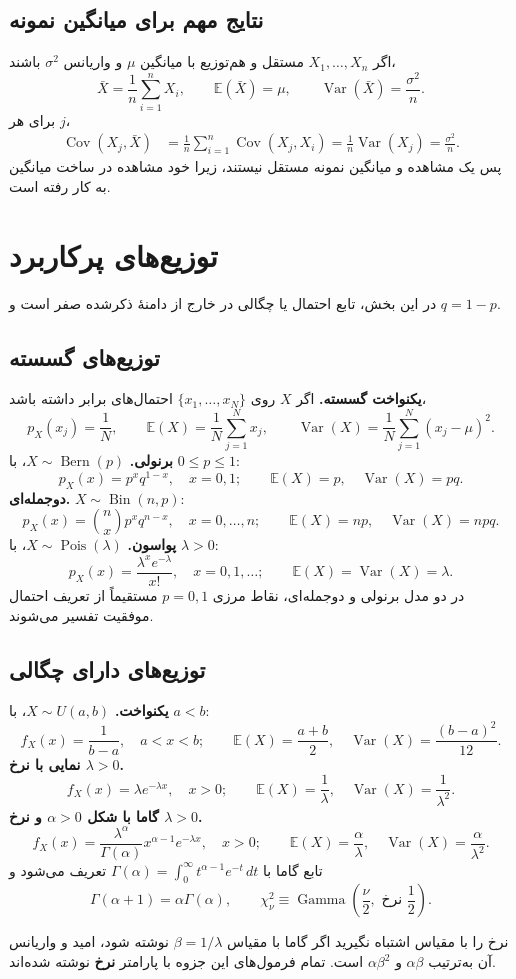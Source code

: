 \documentclass[12pt,a4paper,oneside]{report}
\newcounter{ex}[chapter]
\newcommand{\E}{\mathbb E}
\newcommand{\Var}{\operatorname{Var}}
\newcommand{\Cov}{\operatorname{Cov}}
\begin{document}
\subsection{نتایج مهم برای میانگین نمونه}
اگر $X_1,\ldots,X_n$ مستقل و هم‌توزیع با میانگین $\mu$ و واریانس $\sigma^2$ باشند،
\[
\bar X=\frac1n\sum_{i=1}^nX_i,\qquad
\E(\bar X)=\mu,\qquad \Var(\bar X)=\frac{\sigma^2}{n}.
\]
برای هر $j$،
\begin{align*}
\Cov(X_j,\bar X)
&=\frac1n\sum_{i=1}^n\Cov(X_j,X_i)
=\frac1n\Var(X_j)=\frac{\sigma^2}{n}.
\end{align*}
پس یک مشاهده و میانگین نمونه مستقل نیستند، زیرا خود مشاهده در ساخت میانگین به کار رفته است.
\section{توزیع‌های پرکاربرد}
در این بخش، تابع احتمال یا چگالی در خارج از دامنهٔ ذکرشده صفر است و $q=1-p$.
\subsection{توزیع‌های گسسته}
\textbf{یکنواخت گسسته.} اگر $X$ روی $\{x_1,\ldots,x_N\}$ احتمال‌های برابر داشته باشد،
\[
p_X(x_j)=\frac1N,\qquad
\E(X)=\frac1N\sum_{j=1}^N x_j,\qquad
\Var(X)=\frac1N\sum_{j=1}^N(x_j-\mu)^2.
\]
\textbf{برنولی.} $X\sim\operatorname{Bern}(p)$، با $0\le p\le1$:
\[
p_X(x)=p^xq^{1-x},\quad x=0,1;\qquad
\E(X)=p,\quad\Var(X)=pq.
\]
\textbf{دوجمله‌ای.} $X\sim\operatorname{Bin}(n,p)$:
\[
p_X(x)=\binom nx p^xq^{n-x},\quad x=0,\ldots,n;\qquad
\E(X)=np,\quad\Var(X)=npq.
\]
\textbf{پواسون.} $X\sim\operatorname{Pois}(\lambda)$، با $\lambda>0$:
\[
p_X(x)=\frac{\lambda^x e^{-\lambda}}{x!},\quad x=0,1,\ldots;
\qquad\E(X)=\Var(X)=\lambda.
\]
در دو مدل برنولی و دوجمله‌ای، نقاط مرزی $p=0,1$ مستقیماً از تعریف احتمال موفقیت تفسیر می‌شوند.
\subsection{توزیع‌های دارای چگالی}
\textbf{یکنواخت.} $X\sim U(a,b)$، با $a<b$:
\[
f_X(x)=\frac1{b-a},\quad a<x<b;\qquad
\E(X)=\frac{a+b}{2},\quad\Var(X)=\frac{(b-a)^2}{12}.
\]
\textbf{نمایی با نرخ $\lambda>0$.}
\[
f_X(x)=\lambda e^{-\lambda x},\quad x>0;\qquad
\E(X)=\frac1\lambda,\quad\Var(X)=\frac1{\lambda^2}.
\]
\textbf{گاما با شکل $\alpha>0$ و نرخ $\lambda>0$.}
\[
f_X(x)=\frac{\lambda^\alpha}{\Gamma(\alpha)}x^{\alpha-1}e^{-\lambda x},\quad x>0;
\qquad\E(X)=\frac\alpha\lambda,\quad\Var(X)=\frac\alpha{\lambda^2}.
\]
تابع گاما با $\Gamma(\alpha)=\int_0^\infty t^{\alpha-1}e^{-t}\,dt$ تعریف می‌شود و
\[
\Gamma(\alpha+1)=\alpha\Gamma(\alpha),\qquad
\chi^2_\nu\equiv\operatorname{Gamma}\left(\frac\nu2,\text{ نرخ }\frac12\right).
\]
\begin{important}{نرخ را با مقیاس اشتباه نگیرید}
اگر گاما با مقیاس $\beta=1/\lambda$ نوشته شود، امید و واریانس آن به‌ترتیب $\alpha\beta$ و $\alpha\beta^2$ است. تمام فرمول‌های این جزوه با پارامتر \textbf{نرخ} نوشته شده‌اند.
\end{important}
\end{document}
